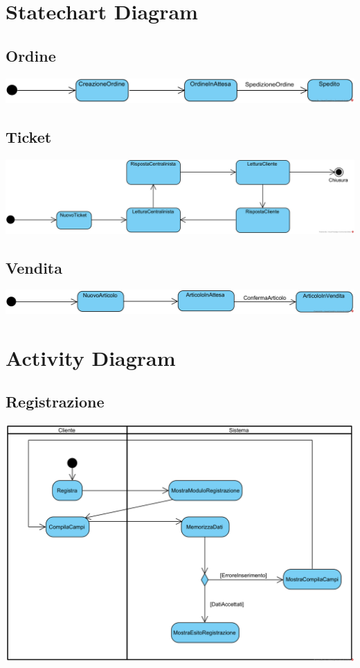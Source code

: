 \documentclass[12pt,a4paper]{article}
\begin{document}
\newpage

\section{Statechart Diagram}

\subsection{Ordine}
\includegraphics[width=\textwidth]{StateChart/Ordine}

\subsection{Ticket}
\includegraphics[width=\textwidth]{StateChart/Ticket}

\subsection{Vendita}
\includegraphics[width=\textwidth]{StateChart/Vendita}

\newpage

\section{Activity Diagram}

\subsection{Registrazione}
\begin{center}
\includegraphics[width=\textwidth]{ActivityDiagram/ClienteRegistrazione}
\end{center}
\end{document}
